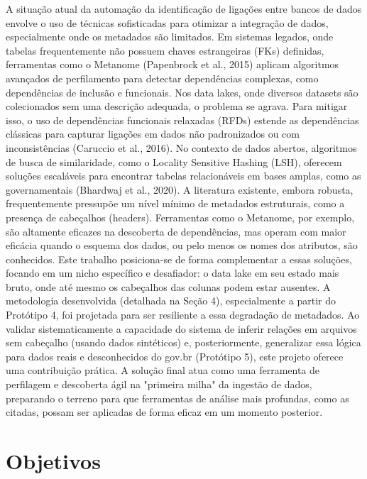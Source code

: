 \documentclass[12pt, a4paper]{article}
\begin{document}
A situação atual da automação da identificação de ligações entre bancos de dados envolve o uso de técnicas sofisticadas para otimizar a integração de dados, especialmente onde os metadados são limitados. 
Em sistemas legados, onde tabelas frequentemente não possuem chaves estrangeiras (FKs) definidas, ferramentas como o Metanome (Papenbrock et al., 2015) aplicam algoritmos avançados de perfilamento para detectar dependências complexas, como dependências de inclusão e funcionais. 
Nos data lakes, onde diversos datasets são colecionados sem uma descrição adequada, o problema se agrava. 
Para mitigar isso, o uso de dependências funcionais relaxadas (RFDs) estende as dependências clássicas para capturar ligações em dados não padronizados ou com inconsistências (Caruccio et al., 2016). 
No contexto de dados abertos, algoritmos de busca de similaridade, como o Locality Sensitive Hashing (LSH), oferecem soluções escaláveis para encontrar tabelas relacionáveis em bases amplas, como as governamentais (Bhardwaj et al., 2020). 
A literatura existente, embora robusta, frequentemente pressupõe um nível mínimo de metadados estruturais, como a presença de cabeçalhos (headers). 
Ferramentas como o Metanome, por exemplo, são altamente eficazes na descoberta de dependências, mas operam com maior eficácia quando o esquema dos dados, ou pelo menos os nomes dos atributos, são conhecidos. 
Este trabalho posiciona-se de forma complementar a essas soluções, focando em um nicho específico e desafiador: o data lake em seu estado mais bruto, onde até mesmo os cabeçalhos das colunas podem estar ausentes. 
A metodologia desenvolvida (detalhada na Seção 4), especialmente a partir do Protótipo 4, foi projetada para ser resiliente a essa degradação de metadados. 
Ao validar sistematicamente a capacidade do sistema de inferir relações em arquivos sem cabeçalho (usando dados sintéticos) e, posteriormente, generalizar essa lógica para dados reais e desconhecidos do gov.br (Protótipo 5), este projeto oferece uma contribuição prática.
A solução final atua como uma ferramenta de perfilagem e descoberta ágil na "primeira milha" da ingestão de dados, preparando o terreno para que ferramentas de análise mais profundas, como as citadas, possam ser aplicadas de forma eficaz em um momento posterior. 

\newpage
\section{Objetivos} 
\label{sec:objetivos}
\end{document}

